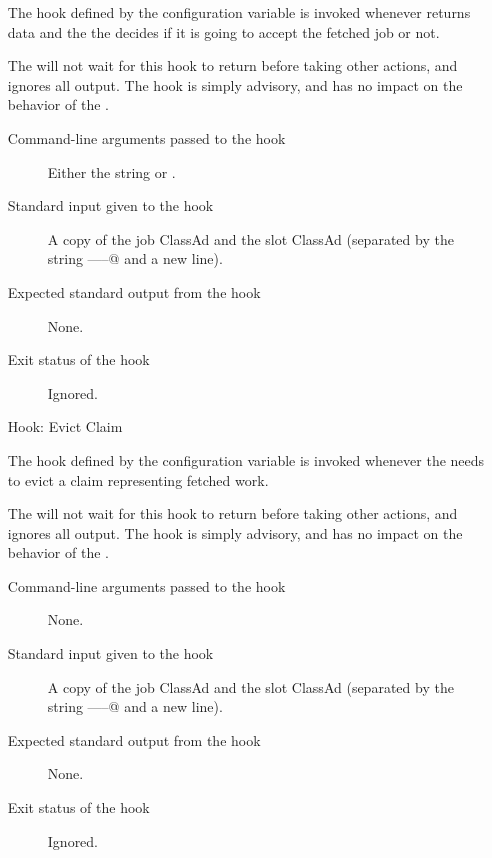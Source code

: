 \begin{itemize}
The hook defined by the configuration variable
 is invoked whenever
 returns data and the the 
decides if it is going to accept the fetched job or not.

The  will not wait for this hook to return before
taking other actions, and ignores all output.
The hook is simply advisory, and has no impact on the behavior of the
.

\begin{description}
\item[Command-line arguments passed to the hook]
  Either the string \verb@accept@ or \verb@reject@.

\item[Standard input given to the hook]
  A copy of the job ClassAd and the slot ClassAd
  (separated by the string \verb@-----@ and a new line).

\item[Expected standard output from the hook]
  None.

\item[Exit status of the hook]
  Ignored.
\end{description}


\item[Hook: Evict Claim]

The hook defined by the configuration variable
 is invoked whenever the 
needs to evict a claim representing fetched work.

The  will not wait for this hook to return before
taking other actions, and ignores all output.
The hook is simply advisory, and has no impact on the behavior of the
.

\begin{description}
\item[Command-line arguments passed to the hook]
  None.

\item[Standard input given to the hook]
  A copy of the job ClassAd and the slot ClassAd
  (separated by the string \verb@-----@ and a new line).

\item[Expected standard output from the hook]
  None.

\item[Exit status of the hook]
  Ignored.
\end{description}



\end{itemize}
